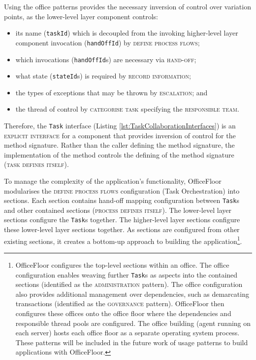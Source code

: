 \documentclass[prodmode]{style/acmlarge}
\begin{document}
Using the office patterns provides the necessary inversion of control over
variation points, as the lower-level layer component controls:
\begin{itemize}
  \item its name (\texttt{taskId}) which is decoupled from the invoking higher-level layer component invocation (\texttt{handOffId}) by \textsc{define process flows};
  \item which invocations (\texttt{handOffId}s) are necessary via \textsc{hand-off};
  \item what state (\texttt{stateId}s) is required by \textsc{record information};
  \item the types of exceptions that may be thrown by \textsc{escalation}; and
  \item the thread of control by \textsc{categorise task} specifying the \textsc{responsible team}.
\end{itemize}

Therefore, the \texttt{Task} interface (Listing
\ref{lst:TaskCollaborationInterfaces}) is an \textsc{explicit interface} for a
component that provides inversion of control for the method signature.
Rather than the caller defining the method signature, the implementation of the
method controls the defining of the method signature (\textsc{task defines
itself}).

To manage the complexity of the application's functionality, OfficeFloor
modularises the \textsc{define process flows} configuration (Task Orchestration)
into sections.  Each section contains hand-off mapping configuration between
\texttt{Task}s and other contained sections (\textsc{process defines itself}).
The lower-level layer sections configure the \texttt{Task}s together.  The
higher-level layer sections configure these lower-level layer sections together.
As sections are configured from other existing sections, it creates a bottom-up
approach to building the application\footnote{OfficeFloor configures the
top-level sections within an office.  The office configuration enables weaving
further \texttt{Task}s as aspects into the contained sections (identified as the
\textsc{administration} pattern).  The office configuration also provides
additional management over dependencies, such as demarcating transactions
(identified as the \textsc{governance} pattern). OfficeFloor then configures
these offices onto the office floor where the dependencies and responsible
thread pools are configured.  The office building (agent running on each server)
hosts each office floor as a separate operating system process.  These patterns
will be included in the future work of usage patterns to build applications with
OfficeFloor.}.
\end{document}
